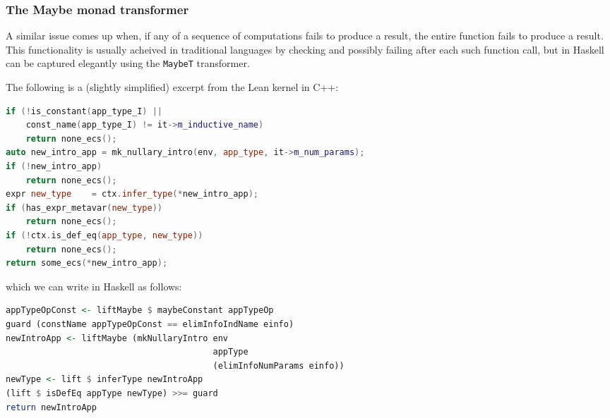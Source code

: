 \documentclass{article}
\begin{document}
\begin{spacing}{1.1}
\subsubsection{The Maybe monad transformer}

A similar issue comes up when, if any of a sequence of computations fails to produce a result, the entire function fails to produce a result. This functionality is usually acheived in traditional languages by checking and possibly failing after each such function call, but in Haskell can be captured elegantly using the \lstinline{MaybeT} transformer.

The following is a (slightly simplified) excerpt from the Lean kernel in C++:
\begin{lstlisting}[language=C++]
if (!is_constant(app_type_I) ||
    const_name(app_type_I) != it->m_inductive_name)
    return none_ecs();
auto new_intro_app = mk_nullary_intro(env, app_type, it->m_num_params);
if (!new_intro_app)
    return none_ecs();
expr new_type    = ctx.infer_type(*new_intro_app);
if (has_expr_metavar(new_type))
    return none_ecs();
if (!ctx.is_def_eq(app_type, new_type))
    return none_ecs();
return some_ecs(*new_intro_app);
\end{lstlisting}

which we can write in Haskell as follows:

\begin{lstlisting}[language=Haskell]
appTypeOpConst <- liftMaybe $ maybeConstant appTypeOp
guard (constName appTypeOpConst == elimInfoIndName einfo)
newIntroApp <- liftMaybe (mkNullaryIntro env
                                         appType
                                         (elimInfoNumParams einfo))
newType <- lift $ inferType newIntroApp
(lift $ isDefEq appType newType) >>= guard
return newIntroApp
\end{lstlisting}

\end{spacing}



\end{document}
